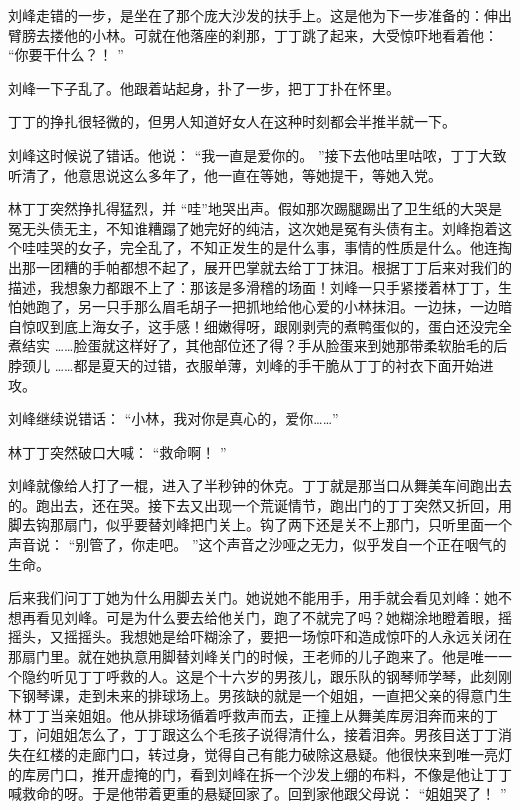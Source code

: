 \documentclass[12pt,twoside,openany]{book}
\begin{document}
刘峰走错的一步，是坐在了那个庞大沙发的扶手上。这是他为下一步准备的：伸出臂膀去搂他的小林。可就在他落座的刹那，丁丁跳了起来，大受惊吓地看着他： “你要干什么？！ ”

刘峰一下子乱了。他跟着站起身，扑了一步，把丁丁扑在怀里。

丁丁的挣扎很轻微的，但男人知道好女人在这种时刻都会半推半就一下。

刘峰这时候说了错话。他说： “我一直是爱你的。 ”接下去他咕里咕哝，丁丁大致听清了，他意思说这么多年了，他一直在等她，等她提干，等她入党。

林丁丁突然挣扎得猛烈，并 “哇”地哭出声。假如那次踢腿踢出了卫生纸的大哭是冤无头债无主，不知谁糟蹋了她完好的纯洁，这次她是冤有头债有主。刘峰抱着这个哇哇哭的女子，完全乱了，不知正发生的是什么事，事情的性质是什么。他连掏出那一团糟的手帕都想不起了，展开巴掌就去给丁丁抹泪。根据丁丁后来对我们的描述，我想象力都跟不上了：那该是多滑稽的场面！刘峰一只手紧搂着林丁丁，生怕她跑了，另一只手那么眉毛胡子一把抓地给他心爱的小林抹泪。一边抹，一边暗自惊叹到底上海女子，这手感！细嫩得呀，跟刚剥壳的煮鸭蛋似的，蛋白还没完全煮结实 ……脸蛋就这样好了，其他部位还了得？手从脸蛋来到她那带柔软胎毛的后脖颈儿 ……都是夏天的过错，衣服单薄，刘峰的手干脆从丁丁的衬衣下面开始进攻。

刘峰继续说错话： “小林，我对你是真心的，爱你……”

林丁丁突然破口大喊： “救命啊！ ”

刘峰就像给人打了一棍，进入了半秒钟的休克。丁丁就是那当口从舞美车间跑出去的。跑出去，还在哭。接下去又出现一个荒诞情节，跑出门的丁丁突然又折回，用脚去钩那扇门，似乎要替刘峰把门关上。钩了两下还是关不上那门，只听里面一个声音说： “别管了，你走吧。 ”这个声音之沙哑之无力，似乎发自一个正在咽气的生命。

后来我们问丁丁她为什么用脚去关门。她说她不能用手，用手就会看见刘峰：她不想再看见刘峰。可是为什么要去给他关门，跑了不就完了吗？她糊涂地瞪着眼，摇摇头，又摇摇头。我想她是给吓糊涂了，要把一场惊吓和造成惊吓的人永远关闭在那扇门里。就在她执意用脚替刘峰关门的时候，王老师的儿子跑来了。他是唯一一个隐约听见丁丁呼救的人。这是个十六岁的男孩儿，跟乐队的钢琴师学琴，此刻刚下钢琴课，走到未来的排球场上。男孩缺的就是一个姐姐，一直把父亲的得意门生林丁丁当亲姐姐。他从排球场循着呼救声而去，正撞上从舞美库房泪奔而来的丁丁，问姐姐怎么了，丁丁跟这么个毛孩子说得清什么，接着泪奔。男孩目送丁丁消失在红楼的走廊门口，转过身，觉得自己有能力破除这悬疑。他很快来到唯一亮灯的库房门口，推开虚掩的门，看到刘峰在拆一个沙发上绷的布料，不像是他让丁丁喊救命的呀。于是他带着更重的悬疑回家了。回到家他跟父母说： “姐姐哭了！ ”
\end{document}
